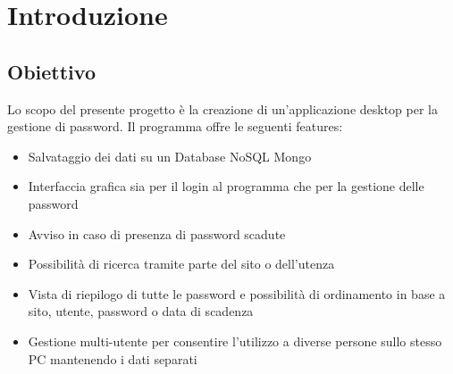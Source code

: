 \chapter{Introduzione}
\section{Obiettivo}
Lo scopo del presente progetto è la creazione di un'applicazione desktop per la gestione di password. Il programma offre le seguenti features:
\begin{itemize}
	\item Salvataggio dei dati su un Database NoSQL Mongo
	\item Interfaccia grafica sia per il login al programma che per la gestione delle password
	\item Avviso in caso di presenza di password scadute
	\item Possibilità di ricerca tramite parte del sito o dell'utenza
	\item Vista di riepilogo di tutte le password e possibilità di ordinamento in base a sito, utente, password o data di scadenza
	\item Gestione multi-utente per consentire l'utilizzo a diverse persone sullo stesso PC mantenendo i dati separati
\end{itemize}
\newpage
